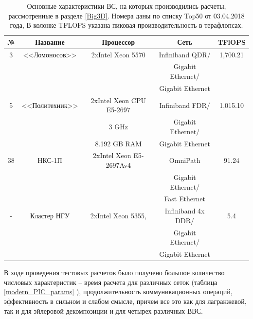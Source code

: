 \begin{table}[ht]
	\caption{
		Основные характеристики ВС, на которых производились расчеты, рассмотренные в разделе \ref{Big3D}. Номера даны по списку Top50 от 03.04.2018 года, В колонке TFLOPS указана пиковая производительность в терафлопсах.}
	\begin{center}
		\begin{tabular}{|c|c|c|c|c|}
			\hline
			
			№ & Название       & Процессор                & Сеть                &  TFlOPS\\
			\hline 
			3 & <<Ломоносов>>  &  2xIntel Xeon 5570       &  Infiniband QDR/   &   1,700.21 \\
			&                &                          &  Gigabit Ethernet/ &            \\
			&                &                          &  Gigabit Ethernet  &            \\ \hline
			
			5 & <<Политехник>> & 2xIntel Xeon CPU E5-2697 &  Infiniband FDR/   &   1,015.10 \\
			&                & 3 GHz                    &  Gigabit Ethernet/ &            \\
			&                & 8.192 GB RAM             &  Gigabit Ethernet  &            \\ \hline
			
			38& НКС-1П         & 2xIntel Xeon E5-2697Av4  & OmniPath           & 91.24      \\
			&                 &                          & Gigabit Ethernet/  &            \\
			&                 &                          & Fast Ethernet      &            \\ \hline
			
			- & Кластер НГУ    & 2xIntel Xeon 5355,       &  Infiniband 4x DDR/& 5.4 \\ 
			&			       &                          &   Gigabit Ethernet/&  \\
			&			       &                          &   Gigabit Ethernet &  \\ \hline                    
			
		\end{tabular}
	\end{center}
	\label{top50_2018}
\end{table}


В ходе проведения тестовых расчетов было получено большое количество числовых характеристик – время расчета для различных сеток (таблица \ref{modern_PIC_params} ), продолжительность коммуникационных операций, эффективность в сильном и слабом смысле, причем все это как для лагранжевой, так и для эйлеровой декомпозиции и для четырех различных ВВС. 

